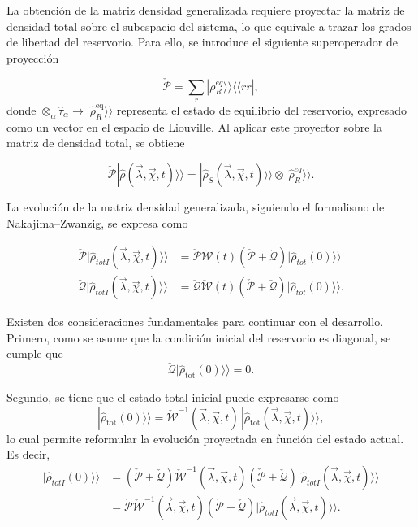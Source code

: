 \begin{appendixs}
La obtención de la matriz densidad generalizada requiere proyectar la matriz de densidad total sobre el subespacio del sistema, lo que equivale a trazar los grados de libertad del reservorio. Para ello, se introduce el siguiente superoperador de proyección

\begin{equation*}
    \check{\mathcal{P}} = \sum_{r}|\rho_{R}^{eq} \rangle \rangle \langle \langle rr|,
\end{equation*}
donde \(\otimes_{\alpha} \hat{\tau}_{\alpha} \to |\hat{\rho}_{R}^{\mathrm{eq}} \rangle\rangle\) representa el estado de equilibrio del reservorio, expresado como un vector en el espacio de Liouville. Al aplicar este proyector sobre la matriz de densidad total, se obtiene

\begin{equation*}
    \check{\mathcal{P}}|\hat{\rho}(\vec{\lambda},\vec{\chi},t) \rangle \rangle = |\hat{\rho}_{S}(\vec{\lambda},\vec{\chi},t)\rangle \rangle \otimes |\hat{\rho}^{eq}_{R}\rangle \rangle .
\end{equation*}

La evolución de la matriz densidad generalizada, siguiendo el formalismo de Nakajima–Zwanzig, se expresa como

\begin{align}
    \check{\mathcal{P}}|\hat{\rho}_{totI}(\vec{\lambda},\vec{\chi},t)\rangle \rangle & =  \check{\mathcal{P}} \check{\mathcal{W}}(t)( \check{\mathcal{P}} +  \check{\mathcal{Q}})|\hat{\rho}_{tot}(0)\rangle \rangle  \label{apendix2proyectionev1} \\
    \check{\mathcal{Q}}|\hat{\rho}_{totI}(\vec{\lambda},\vec{\chi},t)\rangle \rangle & = \check{\mathcal{Q}} \check{\mathcal{W}}(t)( \check{\mathcal{P}} +  \check{\mathcal{Q}})|\hat{\rho}_{tot}(0)\rangle \rangle. 
\label{apendix2proyectionev}
\end{align}

Existen dos consideraciones fundamentales para continuar con el desarrollo. Primero, como se asume que la condición inicial del reservorio es diagonal, se cumple que
\[
\check{\mathcal{Q}}|\hat{\rho}_{\mathrm{tot}}(0)\rangle\rangle = 0.
\]

Segundo, se tiene que el estado total inicial puede expresarse como
\[
|\hat{\rho}_{\mathrm{tot}}(0)\rangle\rangle = \check{\mathcal{W}}^{-1}(\vec{\lambda}, \vec{\chi}, t)\, |\hat{\rho}_{\mathrm{tot}}(\vec{\lambda}, \vec{\chi}, t)\rangle\rangle,
\]
lo cual permite reformular la evolución proyectada en función del estado actual. Es decir, 
\begin{align*}
    |\hat{\rho}_{totI}(0)\rangle \rangle & = (\check{\mathcal{P}} + \check{\mathcal{Q}} )\check{\mathcal{W}}^{-1}(\vec{\lambda},\vec{\chi},t)(\check{\mathcal{P}} + \check{\mathcal{Q}})|\hat{\rho}_{totI}(\vec{\lambda},\vec{\chi},t)\rangle \rangle \\
        & = \check{\mathcal{P}}\check{\mathcal{W}}^{-1}(\vec{\lambda},\vec{\chi},t)(\check{\mathcal{P}} + \check{\mathcal{Q}})|\hat{\rho}_{totI}(\vec{\lambda},\vec{\chi},t)\rangle \rangle.
\end{align*}


\end{appendixs}
